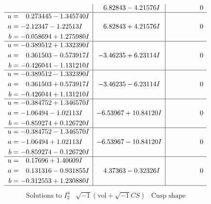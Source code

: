 \documentclass[1p]{elsarticle_modified}
\theoremstyle{definition}
\newcommand{\I}{\sqrt{-1}}
\begin{document}
$$\begin{array}{c|c|c}
 & \phantom{-}6.82843 - 4.21576 I & \phantom{-0.000000 } 0 \\ \hline\begin{aligned}
u &= \phantom{-}0.273445 - 1.345740 I \\
a &= -2.12347 - 1.22513 I \\
b &= -0.058694 + 1.275980 I\end{aligned}
 & \phantom{-}6.82843 + 4.21576 I & \phantom{-0.000000 } 0 \\ \hline\begin{aligned}
u &= -0.389512 + 1.332390 I \\
a &= \phantom{-}0.361503 - 0.573917 I \\
b &= -0.426044 - 1.131210 I\end{aligned}
 & -3.46235 + 6.23114 I & \phantom{-0.000000 } 0 \\ \hline\begin{aligned}
u &= -0.389512 - 1.332390 I \\
a &= \phantom{-}0.361503 + 0.573917 I \\
b &= -0.426044 + 1.131210 I\end{aligned}
 & -3.46235 - 6.23114 I & \phantom{-0.000000 } 0 \\ \hline\begin{aligned}
u &= -0.384752 + 1.346570 I \\
a &= -1.06494 - 1.02113 I \\
b &= -0.859274 + 0.126720 I\end{aligned}
 & -6.53967 + 10.84120 I & \phantom{-0.000000 } 0 \\ \hline\begin{aligned}
u &= -0.384752 - 1.346570 I \\
a &= -1.06494 + 1.02113 I \\
b &= -0.859274 - 0.126720 I\end{aligned}
 & -6.53967 - 10.84120 I & \phantom{-0.000000 } 0 \\ \hline\begin{aligned}
u &= \phantom{-}0.17696 + 1.40609 I \\
a &= \phantom{-}0.131316 - 0.931855 I \\
b &= -0.312553 + 1.230880 I\end{aligned}
 & \phantom{-}4.37363 - 0.32326 I & \phantom{-0.000000 } 0\\
 \hline 
 \end{array}$$\newpage$$\begin{array}{c|c|c}  
\text{Solutions to }I^u_{2}& \I (\text{vol} + \sqrt{-1}CS) & \text{Cusp shape}\\

\end{array}$$
\end{document}
